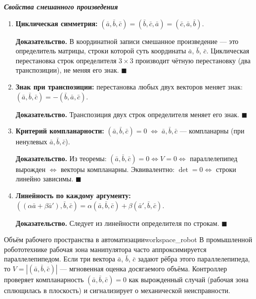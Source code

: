 \documentclass[12pt,a4paper]{article}
\newenvironment{myproof}{\noindent\textbf{Доказательство.}}{\hfill$\blacksquare$}
\newcommand{\va}{\bar{a}}
\newcommand{\vb}{\bar{b}}
\newcommand{\vc}{\bar{c}}
\begin{document}
\medskip

\textbf{\textit{Свойства смешанного произведения}}

\begin{enumerate}
  \item \textbf{Циклическая симметрия:}
    $(\va,\vb,\vc) = (\vb,\vc,\va) = (\vc,\va,\vb)$.

    \begin{myproof}
      В координатной записи смешанное произведение --- это определитель
      матрицы, строки которой суть координаты $\va$, $\vb$, $\vc$.
      Циклическая перестановка строк определителя $3\times3$ производит
      чётную перестановку (два транспозиции), не меняя его знак.
    \end{myproof}

  \item \textbf{Знак при транспозиции:} перестановка любых двух
    векторов меняет знак:
    $(\va,\vb,\vc) = -(\vb,\va,\vc)$.

    \begin{myproof}
      Транспозиция двух строк определителя меняет его знак.
    \end{myproof}

  \item \textbf{Критерий компланарности:}
    $(\va,\vb,\vc) = 0 \;\Leftrightarrow\; \va,\vb,\vc$ ---
    компланарны (при ненулевых $\va,\vb,\vc$).

    \begin{myproof}
      Из теоремы: $(\va,\vb,\vc)=0 \Leftrightarrow V=0 \Leftrightarrow$
      параллелепипед вырожден $\Leftrightarrow$ векторы компланарны.
      Эквивалентно: $\det = 0 \Leftrightarrow$ строки линейно зависимы.
    \end{myproof}

  \item \textbf{Линейность по каждому аргументу:}
    $((\alpha\va+\beta\va'),\vb,\vc)
    = \alpha(\va,\vb,\vc)+\beta(\va',\vb,\vc)$.

    \begin{myproof}
      Следует из линейности определителя по строкам.
    \end{myproof}
\end{enumerate}

\begin{remarkIT}{Объём рабочего пространства в автоматизации}{workspace_robot}
  В промышленной робототехнике рабочая зона манипулятора часто
  аппроксимируется параллелепипедом. Если три вектора $\va$, $\vb$,
  $\vc$ задают рёбра этого параллелепипеда, то
  $V = |(\va,\vb,\vc)|$ --- мгновенная оценка досягаемого объёма.
  Контроллер проверяет компланарность $(\va,\vb,\vc)=0$ как
  вырожденный случай (рабочая зона сплющилась в плоскость) и
  сигнализирует о механической неисправности.
\end{remarkIT}
\end{document}
